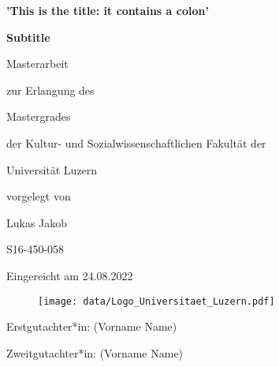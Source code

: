 \begin{titlepage}

\begin{center}

\Huge \textbf{'This is the title: it contains a colon'}

\Large \textbf{Subtitle}

\large Masterarbeit

\large zur Erlangung des

\large Mastergrades

\large der Kultur- und Sozialwissenschaftlichen Fakultät der

\large Universität Luzern



\large vorgelegt von



\large Lukas Jakob

\large S16-450-058

\large Eingereicht am 24.08.2022


\end{center}

\begin{figure}[!htbp]
		\begin{center}
			\texttt{[image: data/Logo\_Universitaet\_Luzern.pdf]}
		\end{center}
\end{figure}

\begin{flushleft}
\small Erstgutachter*in: (Vorname Name)

\small Zweitgutachter*in: (Vorname Name)
\end{flushleft}
\end{titlepage}